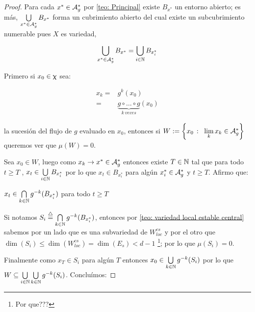 \begin{proof}
	Para cada $x^* \in \mathcal{A}_{g}^{*}$ por \ref{teo: Principal} existe $B_{x^*}$ un entorno abierto; es m\'as, $\bigcup\limits_{x^* \in \mathcal{A}_{g}^{*}}{B_{x^{*}}}$ forma un cubrimiento abierto del cual existe un subcubrimiento numerable pues $X$ es variedad, \ie
	
	\[
	\bigcup\limits_{x^* \in \mathcal{A}_{g}^{*}}{B_{x^{*}}} = \bigcup\limits_{i \in {\mathbb{N}}}{B_{x^{*}_{i}}}
	\]
	
	
	Primero si $x_0 \in \upchi$ sea:
	
	\begin{equation*}
	\begin{aligned}
		x_k = & g^k(x_0) \\
		= & \underbrace{g \circ \dots \circ g }_{k \ veces} (x_0)
	\end{aligned}
	\end{equation*}
	
	la sucesi\'on del flujo de $g$ evaluado en $x_0$, entonces si $W := \sett{x_0 \ \colon \ \Biglim{k}{x_k \in \mathcal{A}_g^{*}}}$ queremos ver que $\mu(W) = 0$.
	
	Sea $x_0 \in W$, luego como $x_k \rightarrow x^* \in \mathcal{A}_{g}^{*}$ entonces existe $T \in {\mathbb{N}}$ tal que para todo $t \ge T$ , $x_t \in  \bigcup\limits_{i \in {\mathbb{N}}}{B_{x^{*}_{i}}}$ por lo que $x_t \in B_{x^{*}_{i}}$ para alg\'un $x_{i}^{*} \in \mathcal{A}_{g}^{*}$ y $t \ge T$. Afirmo que:
	
	
	\begin{lemma}
		\label{lemma: teo_principal}
		$x_t \in \bigcap\limits_{k \in {\mathbb{N}}}{g^{-k}(B_{x_{i}^{*}})}$ para todo $t \ge T$
	\end{lemma}
	
	Si notamos $S_i \stackrel{\triangle}{=} \bigcap\limits_{k \in {\mathbb{N}}}{g^{-k}(B_{x_{i}^{*}})}$, entonces por \ref{teo: variedad local estable central} sabemos por un lado que es una subvariedad de $W_{loc}^{cs}$ y por el otro que $\dim(S_i) \le \dim(W_{loc}^{cs}) = \dim(E_s) < d-1$ \footnote{\color{Red}Por que???}; por lo que $\mu(S_i) = 0$.
	
	
	Finalmente como $x_{T} \in S_i$ para alg\'un $T$ entonces $x_0 \in \bigcup\limits_{k \in {\mathbb{N}}}{g^{-k}(S_i)}$ por lo que $W \subseteq \bigcup\limits_{i \in {\mathbb{N}}}{\bigcup\limits_{k \in {\mathbb{N}}}{g^{-k}(S_i)}}$. Conclu\'imos:
	

\end{proof}
